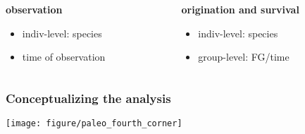 \documentclass{beamer}
\begin{document}
\begin{frame}
\begin{columns}
\begin{column}[T]{0.5\textwidth}
      \textbf{observation}
      \begin{itemize}
        \item indiv-level: species
        \item time of observation
      \end{itemize}
    \end{column}
    \begin{column}[T]{0.5\textwidth}
      \textbf{origination and survival}
      \begin{itemize}
        \item indiv-level: species
        \item group-level: FG/time
      \end{itemize}
    \end{column}
  \end{columns}
\end{frame}

\begin{frame}
  \frametitle{Conceptualizing the analysis}
  \begin{center}
    \texttt{[image: figure/paleo\_fourth\_corner]}
  \end{center}
\end{frame}
\end{document}
